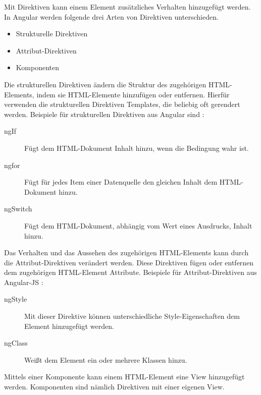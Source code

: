 Mit Direktiven kann einem Element zusätzliches Verhalten hinzugefügt werden. \autocites[vgl.][265]{Steyer.2017}[vgl.][401]{Freeman.2018} In Angular werden folgende drei Arten von Direktiven unterschieden. \autocite[vgl.][]{Google.}

\begin{itemize}
	\item Strukturelle Direktiven 
	\item Attribut-Direktiven
	\item Komponenten
\end{itemize}

Die strukturellen Direktiven ändern die Struktur des zugehörigen HTML-Elements, indem sie HTML-Elemente hinzufügen oder entfernen. Hierfür verwenden die strukturellen Direktiven Templates, die beliebig oft gerendert werden. \autocites[vgl.][269\psqq]{Steyer.2017}[vgl.][365]{Freeman.2018} Beispiele für strukturellen Direktiven aus Angular sind \autocite[vgl.][261\psqq]{Freeman.2018}:
\begin{description}
	\item [ngIf] Fügt dem HTML-Dokument Inhalt hinzu, wenn die Bedingung wahr ist. 
	\item [ngfor] Fügt für jedes Item einer Datenquelle den gleichen Inhalt dem HTML-Dokument hinzu.
	\item [ngSwitch] Fügt dem HTML-Dokument, abhängig vom Wert eines Ausdrucks, Inhalt hinzu.
\end{description} 

Das Verhalten und das Aussehen des zugehörigen HTML-Elements kann durch die Attribut-Direktiven verändert werden. Diese Direktiven fügen oder entfernen dem zugehörigen HTML-Element Attribute. \autocite[vgl.][339]{Freeman.2018} Beispiele für Attribut-Direktiven aus Angular-JS \autocite[vgl.][249\psqq]{Freeman.2018}:
\begin{description}
	\item [ngStyle] Mit dieser Direktive können unterschiedliche Style-Eigenschaften dem Element hinzugefügt werden.
	\item [ngClass] Weißt dem Element ein oder mehrere Klassen hinzu. 
\end{description}

Mittels einer Komponente kann einem HTML-Element eine View hinzugefügt werden. Komponenten sind nämlich Direktiven mit einer eigenen View. \autocites[vgl.][265]{Steyer.2017}


